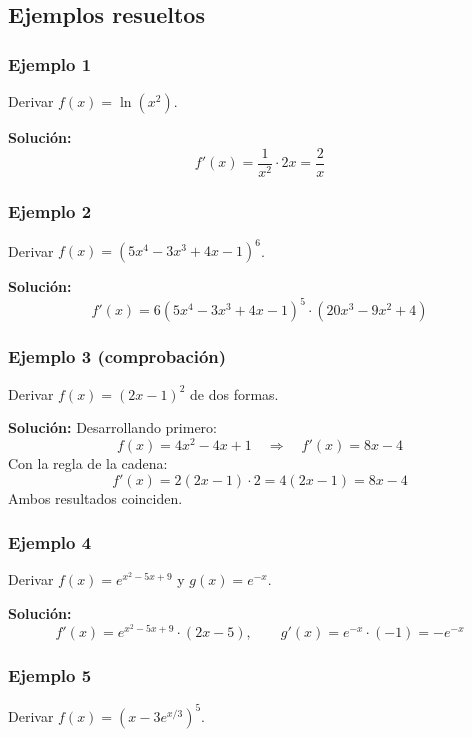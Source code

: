 \documentclass[12pt]{article}
\begin{document}
\subsection{Ejemplos resueltos}

\subsubsection{Ejemplo 1}


Derivar $f(x) = \ln(x^2)$.

\textbf{Solución:}
\[
f'(x) = \frac{1}{x^2} \cdot 2x = \frac{2}{x}
\]



\subsubsection{Ejemplo 2}


Derivar $f(x) = (5x^4 - 3x^3 + 4x - 1)^6$.

\textbf{Solución:}
\[
f'(x) = 6(5x^4 - 3x^3 + 4x - 1)^5 \cdot (20x^3 - 9x^2 + 4)
\]



\subsubsection{Ejemplo 3 (comprobación)}


Derivar $f(x) = (2x - 1)^2$ de dos formas.

\textbf{Solución:} Desarrollando primero:
\[
f(x) = 4x^2 - 4x + 1 \quad \Rightarrow \quad f'(x) = 8x - 4
\]
Con la regla de la cadena:
\[
f'(x) = 2(2x - 1) \cdot 2 = 4(2x - 1) = 8x - 4
\]
Ambos resultados coinciden.



\subsubsection{Ejemplo 4}


Derivar $f(x) = e^{x^2 - 5x + 9}$ y $g(x) = e^{-x}$.

\textbf{Solución:}
\[
f'(x) = e^{x^2 - 5x + 9} \cdot (2x - 5), \qquad g'(x) = e^{-x} \cdot (-1) = -e^{-x}
\]



\subsubsection{Ejemplo 5}


Derivar $f(x) = \left(x - 3e^{x/3}\right)^5$.
\end{document}
